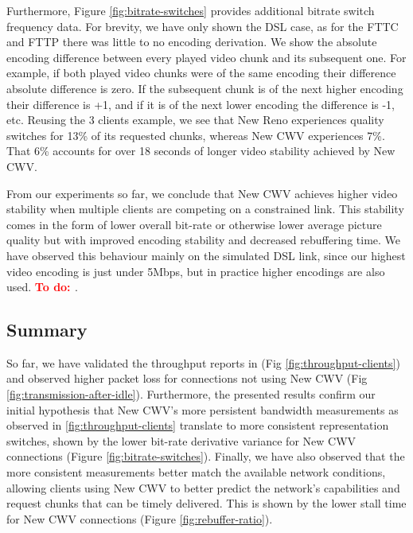 \documentclass[10pt,sigconf]{acmart}
\newcommand{\todo}[1]{\textbf{\textcolor{red}{To do: #1}}}
\begin{document}
Furthermore, Figure \ref{fig:bitrate-switches} provides additional bitrate switch frequency data. For brevity, we have only shown the DSL case, as for the FTTC and FTTP there was little to no encoding derivation. We show the absolute encoding difference between every played video chunk and its subsequent one. For example, if both played video chunks were of the same encoding their difference absolute difference is zero. If the subsequent chunk is of the next higher encoding their difference is +1, and if it is of the next lower encoding the difference is -1, etc. Reusing the 3 clients example, we see that New Reno experiences quality switches for 13\% of its requested chunks, whereas New CWV experiences 7\%. That 6\% accounts for over 18 seconds of longer video stability achieved by New CWV.

From our experiments so far, we conclude that New CWV achieves higher video stability when multiple clients are competing on a constrained link. This stability comes in the form of lower overall bit-rate or otherwise lower average picture quality but with improved encoding stability and decreased rebuffering time. We have observed this behaviour mainly on the simulated DSL link, since our highest video encoding is just under 5Mbps, but in practice higher encodings are also used. \todo{\cite{}}.


\subsection{Summary}

So far, we have validated the throughput reports in \cite{Nazir-2014-performance-evaluation-congestion-window-validation-dash-newcwv} (Fig \ref{fig:throughput-clients}) and observed higher packet loss for connections not using New CWV (Fig \ref{fig:transmission-after-idle}). Furthermore, the presented results confirm our initial hypothesis that New CWV's more persistent bandwidth measurements as observed in \ref{fig:throughput-clients} translate to more consistent representation switches, shown by the lower bit-rate derivative variance for New CWV connections (Figure \ref{fig:bitrate-switches}). Finally, we have also observed that the more consistent measurements better match the available network conditions, allowing clients using New CWV to better predict the network's capabilities and request chunks that can be timely delivered. This is shown by the lower stall time for New CWV connections (Figure \ref{fig:rebuffer-ratio}).

\end{document}
